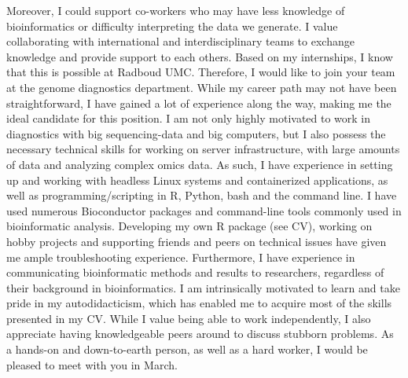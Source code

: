 \documentclass[11pt, a4paper]{awesome-cv}
\begin{document}
\begin{cvletter}
Moreover, I could support co-workers who may have less knowledge of bioinformatics or difficulty interpreting the data we generate. 
I value collaborating with international and interdisciplinary teams to exchange knowledge and provide support to each others.
Based on my internships, I know that this is possible at Radboud UMC. 
Therefore, I would like to join your team at the genome diagnostics department.
While my career path may not have been straightforward, I have gained a lot of experience along the way, making me the ideal candidate for this position. 
I am not only highly motivated to work in diagnostics with big sequencing-data and big computers, but I also possess the necessary technical skills for working on server infrastructure, with large amounts of data and analyzing complex omics data.
As such, I have experience in setting up and working with headless Linux systems and containerized applications, as well as programming/scripting in R, Python, bash and the command line.
I have used numerous Bioconductor packages and command-line tools commonly used in bioinformatic analysis. 
Developing my own R package (see CV), working on hobby projects and supporting friends and peers on technical issues have given me ample troubleshooting experience. 
Furthermore, I have experience in communicating bioinformatic methods and results to researchers, regardless of their background in bioinformatics.
I am intrinsically motivated to learn and take pride in my autodidacticism, which has enabled me to acquire most of the skills presented in my CV. 
While I value being able to work independently, I also appreciate having knowledgeable peers around to discuss stubborn problems. 
As a hands-on and down-to-earth person, as well as a hard worker, I would be pleased to meet with you in March.
\end{cvletter}
\makeletterclosing
\end{document}
